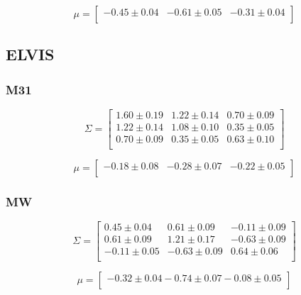 \documentclass[a4paper,fleqn,usenatbib]{mnras}
\begin{document}
\[
\mu= 
\begin{bmatrix}
-0.45\pm 0.04 & -0.61\pm 0.05 & -0.31\pm 0.04\\
\end{bmatrix}
\]

\subsection{ELVIS}

\subsubsection{M31}

\[
\Sigma= 
\begin{bmatrix}
 1.60\pm 0.19  & 1.22\pm 0.14 & 0.70 \pm 0.09\\
  1.22\pm 0.14 &  1.08\pm 0.10 & 0.35 \pm 0.05\\
  0.70\pm 0.09 & 0.35\pm 0.05  & 0.63 \pm 0.10\\
\end{bmatrix}
\]

\[
\mu= 
\begin{bmatrix}
-0.18\pm 0.08 & -0.28\pm 0.07 &-0.22\pm 0.05\\
\end{bmatrix}
\]

\subsubsection{MW}

\[
\Sigma= 
\begin{bmatrix}
 0.45\pm 0.04 & 0.61\pm0.09 & -0.11\pm0.09 \\
  0.61\pm0.09 & 1.21\pm0.17 & -0.63\pm0.09\\
 -0.11\pm0.05 & -0.63\pm0.09 & 0.64\pm0.06\\
\end{bmatrix}
\]


\[
\mu= 
\begin{bmatrix}
-0.32\pm 0.04 -0.74\pm 0.07 -0.08\pm 0.05\\
\end{bmatrix}
\]
\end{document}
